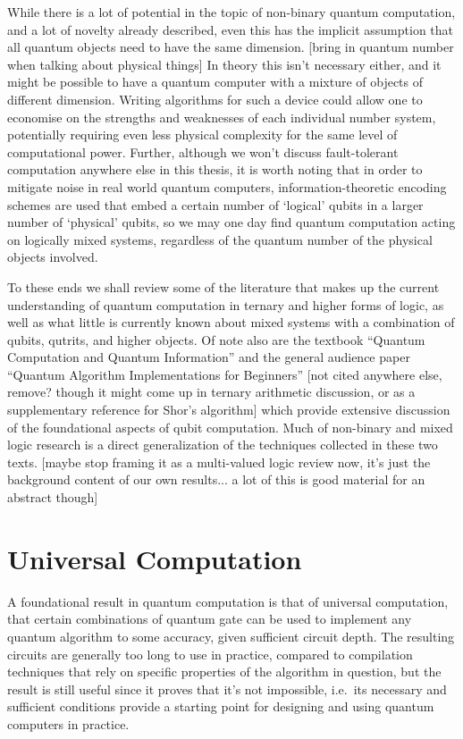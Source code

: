 While there is a lot of potential in the topic of non-binary quantum computation, and a lot of novelty already described, even this has the implicit assumption that all quantum objects need to have the same dimension. [bring in quantum number when talking about physical things] In theory this isn't necessary either, and it might be possible to have a quantum computer with a mixture of objects of different dimension. Writing algorithms for such a device could allow one to economise on the strengths and weaknesses of each individual number system, potentially requiring even less physical complexity for the same level of computational power. Further, although we won't discuss fault-tolerant computation anywhere else in this thesis, it is worth noting that in order to mitigate noise in real world quantum computers, information-theoretic encoding schemes are used that embed a certain number of `logical' qubits in a larger number of `physical' qubits, so we may one day find quantum computation acting on logically mixed systems, regardless of the quantum number of the physical objects involved.

To these ends we shall review some of the literature that makes up the current understanding of quantum computation in ternary and higher forms of logic, as well as what little is currently known about mixed systems with a combination of qubits, qutrits, and higher objects. Of note also are the textbook ``Quantum Computation and Quantum Information''\cite{textbook} and the general audience paper ``Quantum Algorithm Implementations for Beginners''\cite{algos} [not cited anywhere else, remove? though it might come up in ternary arithmetic discussion, or as a supplementary reference for Shor's algorithm] which provide extensive discussion of the foundational aspects of qubit computation. Much of non-binary and mixed logic research is a direct generalization of the techniques collected in these two texts. [maybe stop framing it as a multi-valued logic review now, it's just the background content of our own results... a lot of this is good material for an abstract though]

\section{Universal Computation}
A foundational result in quantum computation is that of universal computation, that certain combinations of quantum gate can be used to implement any quantum algorithm to some accuracy, given sufficient circuit depth. The resulting circuits are generally too long to use in practice, compared to compilation techniques that rely on specific properties of the algorithm in question, but the result is still useful since it proves that it's not impossible, i.e.\ its necessary and sufficient conditions provide a starting point for designing and using quantum computers in practice.

